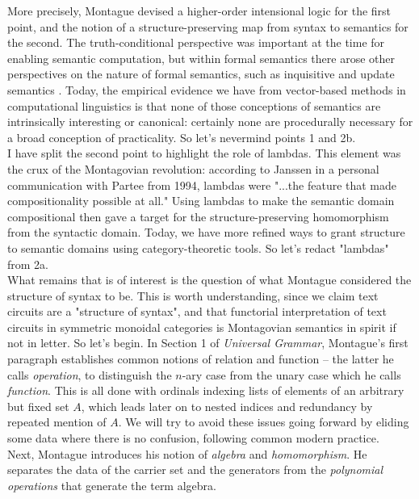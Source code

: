 More precisely, Montague devised a higher-order intensional logic for the first point, and the notion of a structure-preserving map from syntax to semantics for the second. The truth-conditional perspective was important at the time for enabling semantic computation, but within formal semantics there arose other perspectives on the nature of formal semantics, such as inquisitive \citep{noauthor_inquisitive_nodate} and update semantics \citep{nouwen_dynamic_2022}. Today, the empirical evidence we have from vector-based methods in computational linguistics is that none of those conceptions of semantics are intrinsically interesting or canonical: certainly none are procedurally necessary for a broad conception of practicality. So let's nevermind points 1 and 2b.\\

I have split the second point to highlight the role of lambdas. This element was the crux of the Montagovian revolution: according to Janssen in a personal communication with Partee from 1994, lambdas were "...the feature that made compositionality possible at all." Using lambdas to make the semantic domain compositional then gave a target for the structure-preserving homomorphism from the syntactic domain. Today, we have more refined ways to grant structure to semantic domains using category-theoretic tools. So let's redact "lambdas" from 2a.\\

What remains that is of interest is the question of what Montague considered the structure of syntax to be. This is worth understanding, since we claim text circuits are a "structure of syntax", and that functorial interpretation of text circuits in symmetric monoidal categories is Montagovian semantics in spirit if not in letter. So let's begin. In Section 1 of \emph{Universal Grammar}, Montague's first paragraph establishes common notions of relation and function -- the latter he calls \emph{operation}, to distinguish the $n$-ary case from the unary case which he calls \emph{function}. This is all done with ordinals indexing lists of elements of an arbitrary but fixed set $A$, which leads later on to nested indices and redundancy by repeated mention of $A$. We will try to avoid these issues going forward by eliding some data where there is no confusion, following common modern practice.\\

Next, Montague introduces his notion of \emph{algebra} and \emph{homomorphism}. He separates the data of the carrier set and the generators from the \emph{polynomial operations} that generate the term algebra.

